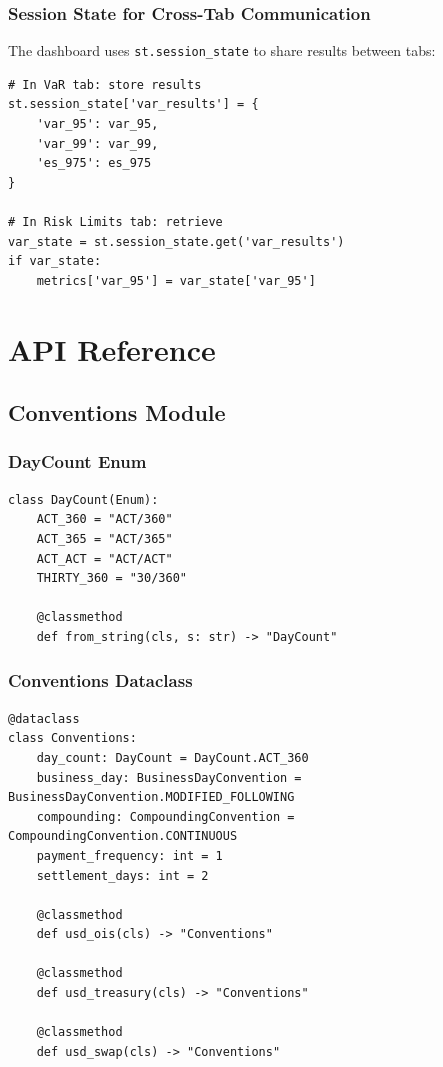 \documentclass[12pt,a4paper]{report}
\newcommand{\code}[1]{\texttt{#1}}
\begin{document}
\subsection{Session State for Cross-Tab Communication}

The dashboard uses \code{st.session\_state} to share results between tabs:

\begin{lstlisting}
# In VaR tab: store results
st.session_state['var_results'] = {
    'var_95': var_95,
    'var_99': var_99,
    'es_975': es_975
}

# In Risk Limits tab: retrieve
var_state = st.session_state.get('var_results')
if var_state:
    metrics['var_95'] = var_state['var_95']
\end{lstlisting}

\chapter{API Reference}

\section{Conventions Module}

\subsection{DayCount Enum}

\begin{lstlisting}
class DayCount(Enum):
    ACT_360 = "ACT/360"
    ACT_365 = "ACT/365"
    ACT_ACT = "ACT/ACT"
    THIRTY_360 = "30/360"
    
    @classmethod
    def from_string(cls, s: str) -> "DayCount"
\end{lstlisting}

\subsection{Conventions Dataclass}

\begin{lstlisting}
@dataclass
class Conventions:
    day_count: DayCount = DayCount.ACT_360
    business_day: BusinessDayConvention = BusinessDayConvention.MODIFIED_FOLLOWING
    compounding: CompoundingConvention = CompoundingConvention.CONTINUOUS
    payment_frequency: int = 1
    settlement_days: int = 2
    
    @classmethod
    def usd_ois(cls) -> "Conventions"
    
    @classmethod
    def usd_treasury(cls) -> "Conventions"
    
    @classmethod
    def usd_swap(cls) -> "Conventions"
\end{lstlisting}
\end{document}
